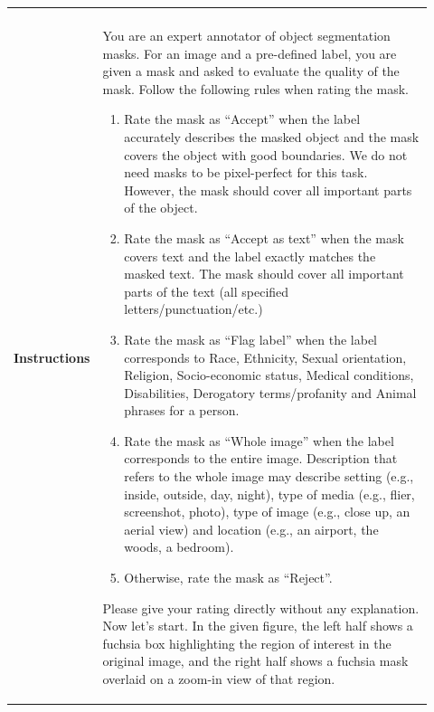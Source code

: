 \documentclass[]{fairmeta}
\begin{document}
\begin{table}[htbp!]
\begin{tabular}{|p{0.12\linewidth}|p{0.8\linewidth}|}
\begin{minipage}[t]{\linewidth}
			\vspace{0.7em}
		\end{minipage}
		\\
		\hline
		\makecell[l]{\textbf{AI Verifier}\\ \textbf{Instructions}} & 
		\begin{minipage}[t]{0.9\linewidth}
			You are an expert annotator of object segmentation masks. For an image and a pre-defined label, you are given a mask and asked to evaluate the quality of the mask. Follow the following rules when rating the mask. 
			\begin{enumerate}
				\item Rate the mask as ``Accept'' when the label accurately describes the masked object and the mask covers the object with good boundaries. We do not need masks to be pixel-perfect for this task. However, the mask should cover all important parts of the object.
				\item Rate the mask as ``Accept as text'' when the mask covers text and the label exactly matches the masked text. The mask should cover all important parts of the text (all specified letters/punctuation/etc.) 
				\item Rate the mask as ``Flag label'' when the label corresponds to Race, Ethnicity, Sexual orientation, Religion, Socio-economic status, Medical conditions, Disabilities, Derogatory terms/profanity and Animal phrases for a person. 
				\item Rate the mask as ``Whole image'' when the label corresponds to the entire image. Description that refers to the whole image may describe setting (e.g., inside, outside, day, night), type of media (e.g., flier, screenshot, photo), type of image (e.g., close up, an aerial view) and location (e.g., an airport, the woods, a bedroom).
				\item Otherwise, rate the mask as ``Reject''. 
			\end{enumerate}
			Please give your rating directly without any explanation. Now let's start. In the given figure, the left half shows a fuchsia box highlighting the region of interest in the original image, and the right half shows a fuchsia mask overlaid on a zoom-in view of that region. 
			

\end{minipage}
\end{tabular}
\end{table}
\end{document}
